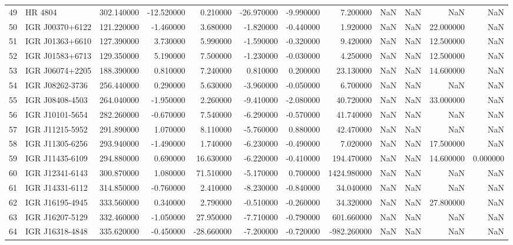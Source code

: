 \begin{tabular}{llrrrrrrrrrr}
49 & HR 4804 & 302.140000 & -12.520000 & 0.210000 & -26.970000 & -9.990000 & 7.200000 & NaN & NaN & NaN & NaN \\
50 & IGR J00370+6122 & 121.220000 & -1.460000 & 3.680000 & -1.820000 & -0.440000 & 1.920000 & NaN & NaN & 22.000000 & NaN \\
51 & IGR J01363+6610 & 127.390000 & 3.730000 & 5.990000 & -1.590000 & -0.320000 & 9.420000 & NaN & NaN & 12.500000 & NaN \\
52 & IGR J01583+6713 & 129.350000 & 5.190000 & 7.500000 & -1.230000 & -0.030000 & 4.250000 & NaN & NaN & 12.500000 & NaN \\
53 & IGR J06074+2205 & 188.390000 & 0.810000 & 7.240000 & 0.810000 & 0.200000 & 23.130000 & NaN & NaN & 14.600000 & NaN \\
54 & IGR J08262-3736 & 256.440000 & 0.290000 & 5.630000 & -3.960000 & -0.050000 & 6.700000 & NaN & NaN & NaN & NaN \\
55 & IGR J08408-4503 & 264.040000 & -1.950000 & 2.260000 & -9.410000 & -2.080000 & 40.720000 & NaN & NaN & 33.000000 & NaN \\
56 & IGR J10101-5654 & 282.260000 & -0.670000 & 7.540000 & -6.290000 & -0.570000 & 41.740000 & NaN & NaN & NaN & NaN \\
57 & IGR J11215-5952 & 291.890000 & 1.070000 & 8.110000 & -5.760000 & 0.880000 & 42.470000 & NaN & NaN & NaN & NaN \\
58 & IGR J11305-6256 & 293.940000 & -1.490000 & 1.740000 & -6.230000 & -0.490000 & 7.020000 & NaN & NaN & 17.500000 & NaN \\
59 & IGR J11435-6109 & 294.880000 & 0.690000 & 16.630000 & -6.220000 & -0.410000 & 194.470000 & NaN & NaN & 14.600000 & 0.000000 \\
60 & IGR J12341-6143 & 300.870000 & 1.080000 & 71.510000 & -5.170000 & 0.700000 & 1424.980000 & NaN & NaN & NaN & NaN \\
61 & IGR J14331-6112 & 314.850000 & -0.760000 & 2.410000 & -8.230000 & -0.840000 & 34.040000 & NaN & NaN & NaN & NaN \\
62 & IGR J16195-4945 & 333.560000 & 0.340000 & 2.790000 & -0.510000 & -0.260000 & 34.320000 & NaN & NaN & 27.800000 & NaN \\
63 & IGR J16207-5129 & 332.460000 & -1.050000 & 27.950000 & -7.710000 & -0.790000 & 601.660000 & NaN & NaN & NaN & NaN \\
64 & IGR J16318-4848 & 335.620000 & -0.450000 & -28.660000 & -7.200000 & -0.720000 & -982.260000 & NaN & NaN & NaN & NaN \\

\end{tabular}
